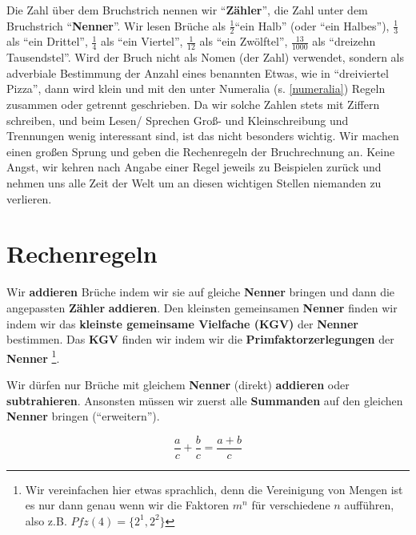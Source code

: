 \documentclass[a4paper]{book}%
\theoremstyle{definition}
\begin{document}
Die Zahl über dem Bruchstrich nennen wir \enquote{\textbf{Zähler}}, die Zahl unter dem Bruchstrich \enquote{\textbf{Nenner}}. Wir lesen Brüche als $\frac{1}{2}$\enquote{ein Halb} (oder \enquote{ein Halbes}), $\frac{1}{3}$ als \enquote{ein Drittel}, $\frac{1}{4}$ als \enquote{ein Viertel}, $\frac{1}{12}$ als \enquote{ein Zwölftel}, $\frac{13}{1000}$ als \enquote{dreizehn Tausendstel}. Wird der Bruch nicht als Nomen (der Zahl) verwendet, sondern als adverbiale Bestimmung der Anzahl eines benannten Etwas, wie in \enquote{dreiviertel Pizza}, dann wird klein und mit den unter Numeralia (s. \ref{numeralia}) Regeln zusammen oder getrennt geschrieben. Da wir solche Zahlen stets mit Ziffern schreiben, und beim Lesen/ Sprechen Groß- und Kleinschreibung und Trennungen wenig interessant sind, ist das nicht besonders wichtig. Wir machen einen großen Sprung und geben die Rechenregeln der Bruchrechnung an. Keine Angst, wir kehren nach Angabe einer Regel jeweils zu Beispielen zurück und nehmen uns alle Zeit der Welt um an diesen wichtigen Stellen niemanden zu verlieren.

\section{Rechenregeln}

Wir \textbf{addieren} Brüche indem wir sie auf gleiche \textbf{Nenner} bringen und dann die angepassten \textbf{Zähler} \textbf{addieren}. Den kleinsten gemeinsamen \textbf{Nenner} finden wir indem wir das \textbf{kleinste gemeinsame Vielfache (KGV)} der \textbf{Nenner} bestimmen. Das \textbf{KGV} finden wir indem wir die \textbf{Primfaktorzerlegungen} der \textbf{Nenner} \footnote{Wir vereinfachen hier etwas sprachlich, denn die Vereinigung von Mengen ist es nur dann genau wenn wir die Faktoren $m^n$ für verschiedene $n$ aufführen, also z.B. $Pfz(4)=\{2^1, 2^2\}$}.

Wir dürfen nur Brüche mit gleichem \textbf{Nenner} (direkt) \textbf{addieren} oder \textbf{subtrahieren}. Ansonsten müssen wir zuerst alle \textbf{Summanden} auf den gleichen \textbf{Nenner} bringen (\enquote{erweitern}).

\begin{equation}
    \frac{a}{c} + \frac{b}{c} = \frac{a+b}{c}
\end{equation}
\end{document}
